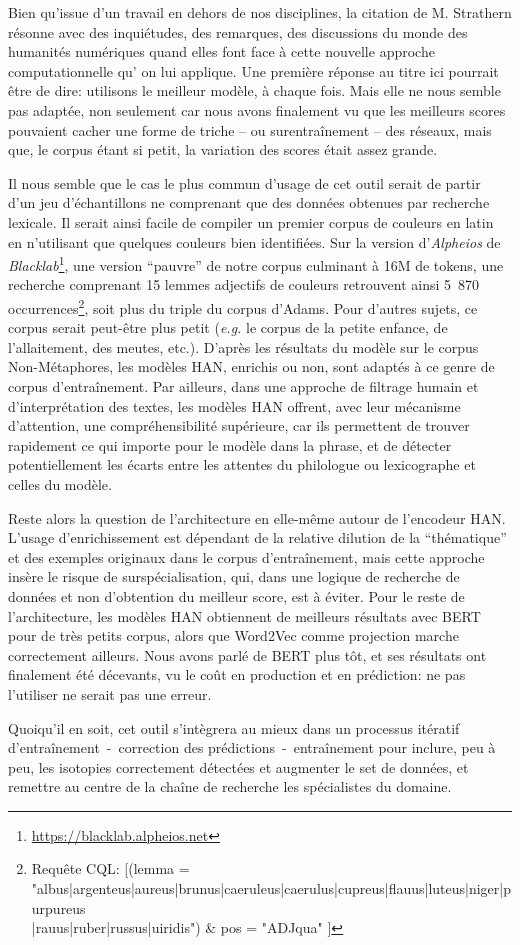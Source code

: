 Bien qu'issue d'un travail en dehors de nos disciplines, la citation de M. Strathern résonne avec des inquiétudes, des remarques, des discussions du monde des humanités numériques quand elles font face à cette nouvelle approche computationnelle qu’ on lui applique. Une première réponse au titre ici pourrait être de dire: utilisons le meilleur modèle, à chaque fois. Mais elle ne nous semble pas adaptée, non seulement car nous avons finalement vu que les meilleurs scores pouvaient cacher une forme de triche -- ou surentraînement -- des réseaux, mais que, le corpus étant si petit, la variation des scores était assez grande.

Il nous semble que le cas le plus commun d'usage de cet outil serait de partir d'un jeu d'échantillons ne comprenant que des données obtenues par recherche lexicale. Il serait ainsi facile de compiler un premier corpus de couleurs en latin en n'utilisant que quelques couleurs bien identifiées. Sur la version d'\textit{Alpheios} de \textit{Blacklab}\footnote{\url{https://blacklab.alpheios.net}}, une version ``pauvre'' de notre corpus culminant à 16M de tokens, une recherche comprenant 15 lemmes adjectifs de couleurs retrouvent ainsi 5~870 occurrences\footnote{Requête CQL: {[(lemma = "albus|argenteus|aureus|brunus|caeruleus|caerulus|cupreus|flauus|luteus|niger|purpureus\\|rauus|ruber|russus|uiridis") \& pos = "ADJqua" ]}}, soit plus du triple du corpus d'Adams. Pour d'autres sujets, ce corpus serait peut-être plus petit (\textit{e.g.} le corpus de la petite enfance, de l'allaitement, des meutes, etc.). D'après les résultats du modèle sur le corpus Non-Métaphores, les modèles HAN, enrichis ou non, sont adaptés à ce genre de corpus d'entraînement. Par ailleurs, dans une approche de filtrage humain et d'interprétation des textes, les modèles HAN offrent, avec leur mécanisme d'attention, une compréhensibilité supérieure, car ils permettent de trouver rapidement ce qui importe pour le modèle dans la phrase, et de détecter potentiellement les écarts entre les attentes du philologue ou lexicographe et celles du modèle. 

Reste alors la question de l'architecture en elle-même autour de l'encodeur HAN. L'usage d'enrichissement est dépendant de la relative dilution de la ``thématique'' et des exemples originaux dans le corpus d'entraînement, mais cette approche insère le risque de surspécialisation, qui, dans une logique de recherche de données et non d'obtention du meilleur score, est à éviter. Pour le reste de l'architecture, les modèles HAN obtiennent de meilleurs résultats avec BERT pour de très petits corpus, alors que Word2Vec comme projection marche correctement ailleurs. Nous avons parlé de BERT plus tôt, et ses résultats ont finalement été décevants, vu le coût en production et en prédiction: ne pas l'utiliser ne serait pas une erreur.

Quoiqu'il en soit, cet outil s'intègrera au mieux dans un processus itératif d'entraînement~-~correction des prédictions~-~entraînement pour inclure, peu à peu, les isotopies correctement détectées et augmenter le set de données, et remettre au centre de la chaîne de recherche les spécialistes du domaine.